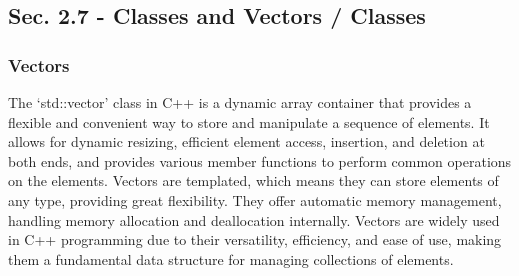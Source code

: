 \subsection*{Sec. 2.7 - Classes and Vectors / Classes}
\subsubsection*{Vectors}

The `std::vector' class in C++ is a dynamic array container that provides a flexible and convenient way to store and manipulate a sequence of elements. It allows for dynamic resizing, efficient element access, insertion, and deletion 
at both ends, and provides various member functions to perform common operations on the elements. Vectors are templated, which means they can store elements of any type, providing great flexibility. They offer automatic memory management, 
handling memory allocation and deallocation internally. Vectors are widely used in C++ programming due to their versatility, efficiency, and ease of use, making them a fundamental data structure for managing collections of elements. \\

